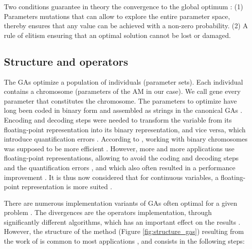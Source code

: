 \documentclass[twocol]{ametsoc}
\begin{document}
Two conditions guarantee in theory the convergence to the global optimum \citep{Zitzler2004a}: (1) Parameters mutations that can allow to explore the entire parameter space, thereby ensures that any value can be achieved with a non-zero probability. (2) A rule of elitism ensuring that an optimal solution cannot be lost or damaged.


\subsection{Structure and operators}

The GAs optimize a population of individuals (parameter sets). Each individual contains a chromosome (parameters of the AM in our case). We call gene every parameter that constitutes the chromosome. The parameters to optimize have long been coded in binary form and assembled as strings in the canonical GAs \citep{Goldberg1989}. Encoding and decoding steps were needed to transform the variable from its floating-point representation into its binary representation, and vice versa, which introduce quantification errors \citep{Haupt2004}. According to \citet{Holland1992b}, working with binary chromosomes was supposed to be more efficient \citep{Goldberg1990a, Back1993b}. However, more and more applications use floating-point representations, allowing to avoid the coding and decoding steps and the quantification errors \citep{Haupt2004}, and which also often resulted in a performance improvement \citep{Goldberg1990a}. It is thus now considered that for continuous variables, a floating-point representation is more suited \citep{Michalewicz1996, Herrera1998a, Haupt2004, Back1996b, Gaffney2010a}. 

There are numerous implementation variants of GAs often optimal for a given problem \citep{Hart1991a,Schraudolph1992a}. The divergences are the operators implementation, through significantly different algorithms, which has an important effect on the results \citep{Gaffney2010a}. However, the structure of the method (Figure \ref{fig:structure_gas}) resulting from the work of \citet{Holland1992b} is common to most applications \citep{Back1993b}, and consists in the following steps:
\end{document}

